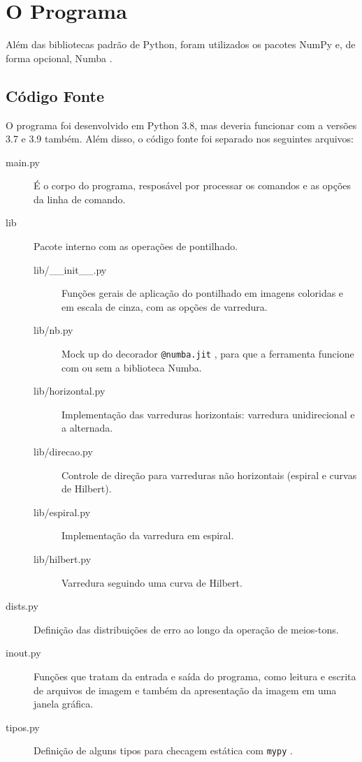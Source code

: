 \section{O Programa}

Além das bibliotecas padrão de Python, foram utilizados os pacotes NumPy \autocite{ref:numpy} e, de forma opcional, Numba \autocite{ref:numba}.

\subsection{Código Fonte}

    O programa foi desenvolvido em Python 3.8, mas deveria funcionar com a versões 3.7 e 3.9 também. Além disso, o código fonte foi separado nos seguintes arquivos:

    \begin{description}
        \item[main.py] É o corpo do programa, resposável por processar os comandos e as opções da linha de comando.

        \item[lib] Pacote interno com as operações de pontilhado.

        \begin{description}
            \item[lib/\_\_init\_\_.py] Funções gerais de aplicação do pontilhado em imagens coloridas e em escala de cinza, com as opções de varredura.

            \item[lib/nb.py] Mock up do decorador \texttt{@numba.jit} \autocite{ref:numbajit}, para que a ferramenta funcione com ou sem a biblioteca Numba.

            \item[lib/horizontal.py] Implementação das varreduras horizontais: varredura unidirecional e a alternada.

            \item[lib/direcao.py] Controle de direção para varreduras não horizontais (espiral e curvas de Hilbert).

            \item[lib/espiral.py] Implementação da varredura em espiral.

            \item[lib/hilbert.py] Varredura seguindo uma curva de Hilbert.
        \end{description}

        \item[dists.py] Definição das distribuições de erro ao longo da operação de meios-tons.

        \item[inout.py] Funções que tratam da entrada e saída do programa, como leitura e escrita de arquivos de imagem e também da apresentação da imagem em uma janela gráfica.

        \item[tipos.py] Definição de alguns tipos para checagem estática com \texttt{mypy} \autocite{ref:mypy}.
    \end{description}

